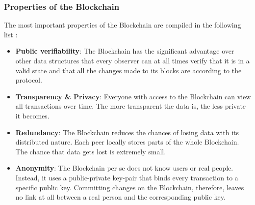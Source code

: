 \subsubsection{Properties of the Blockchain}
The most important properties of the Blockchain are compiled in the following list \cite{Wust2017}:
\begin{itemize}
  \item \textbf{Public verifiability}: The Blockchain has the significant advantage over other data structures that every observer can at all times verify that it is in a valid state and that all the changes made to its blocks are according to the protocol.
  \item \textbf{Transparency \& Privacy}: Everyone with access to the Blockchain can view all transactions over time. The more transparent the data is, the less private it becomes.
  \item \textbf{Redundancy}: The Blockchain reduces the chances of losing data with its distributed nature. Each peer locally stores parts of the whole Blockchain. The chance that data gets lost is extremely small.
  \item \textbf{Anonymity}: The Blockchain per se does not know users or real people. Instead, it uses a public-private key-pair that binds every transaction to a specific public key. Committing changes on the Blockchain, therefore, leaves no link at all between a real person and the corresponding public key.
\end{itemize}

